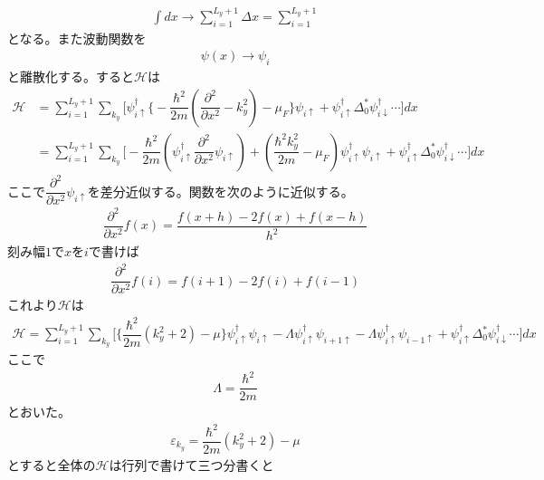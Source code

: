 \documentclass{jarticle}
\begin{document}
\begin{align}
\int dx\rightarrow\sum_{i=1}^{L_y+1}\Delta x=\sum_{i=1}^{L_y+1}
\end{align}
となる。また波動関数を
\begin{align}
\psi(x)\rightarrow\psi_i
\end{align}
と離散化する。すると$\mathcal{H}$は
\begin{align}
\mathcal{H}&=\sum_{i=1}^{L_y+1}\displaystyle\sum_{k_y}\Big[\psi_{i\uparrow}^{\dagger}\big\{-\dfrac{\hbar^2}{2m}(\dfrac{\partial^{2}}{\partial x^2}-k^{2}_y)-\mu_F\big\}\psi_{i\uparrow}+\psi_{i\uparrow}^{\dagger}\Delta^{*}_0\psi_{i\downarrow}^{\dagger}\cdots\Big]dx\\
&=\sum_{i=1}^{L_y+1}\displaystyle\sum_{k_y}\Big[-\dfrac{\hbar^2}{2m}(\psi_{i\uparrow}^{\dagger}\dfrac{\partial^{2}}{\partial x^2}\psi_{i\uparrow})+(\dfrac{\hbar^2k^{2}_y}{2m}-\mu_F)\psi_{i\uparrow}^{\dagger}\psi_{i\uparrow}+\psi_{i\uparrow}^{\dagger}\Delta^{*}_0\psi_{i\downarrow}^{\dagger}\cdots\Big]dx
\end{align}
ここで$\dfrac{\partial^{2}}{\partial x^2}\psi_{i\uparrow}$を差分近似する。関数を次のように近似する。
\begin{align}
\dfrac{\partial^{2}}{\partial x^2}f(x)=\dfrac{f(x+h)-2f(x)+f(x-h)}{h^2}
\end{align}
刻み幅$1$で$x$を$i$で書けば
\begin{align}
\dfrac{\partial^{2}}{\partial x^2}f(i)=f(i+1)-2f(i)+f(i-1)
\end{align}
これより$\mathcal{H}$は
\begin{align}
\mathcal{H}
=\sum_{i=1}^{L_y+1}\displaystyle\sum_{k_y}\Big[\big\{\dfrac{\hbar^2}{2m}(k_y^2+2)-\mu\big\}\psi_{i\uparrow}^{\dagger}\psi_{i\uparrow}-\Lambda\psi_{i\uparrow}^{\dagger}\psi_{i+1\uparrow}-\Lambda\psi_{i\uparrow}^{\dagger}\psi_{i-1\uparrow}+\psi_{i\uparrow}^{\dagger}\Delta^{*}_0\psi_{i\downarrow}^{\dagger}\cdots\Big]dx
\end{align}
ここで
\begin{align}
\Lambda=\dfrac{\hbar^2}{2m}
\end{align}
とおいた。
\begin{align}
\varepsilon_{k_y}=\dfrac{\hbar^2}{2m}(k_y^2+2)-\mu
\end{align}
とすると全体の$\mathcal{H}$は行列で書けて三つ分書くと
\end{document}
